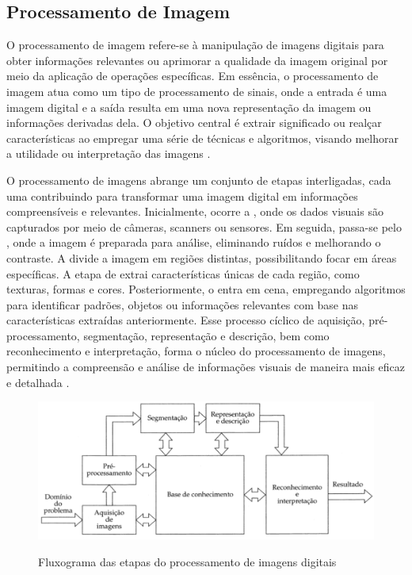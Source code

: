 \subsection[Processamento de Imagem]{Processamento de Imagem}

O processamento de imagem refere-se à manipulação de imagens digitais para obter informações relevantes ou aprimorar a qualidade da imagem original por meio da aplicação de operações específicas. Em essência, o processamento de imagem atua como um tipo de processamento de sinais, onde a entrada é uma imagem digital e a saída resulta em uma nova representação da imagem ou informações derivadas dela. O objetivo central é extrair significado ou realçar características ao empregar uma série de técnicas e algoritmos, visando melhorar a utilidade ou interpretação das imagens \cite{imagemIBM}.

O processamento de imagens abrange um conjunto de etapas interligadas, cada uma contribuindo para transformar uma imagem digital em informações compreensíveis e relevantes. Inicialmente, ocorre a , onde os dados visuais são capturados por meio de câmeras, scanners ou sensores. Em seguida, passa-se pelo , onde a imagem é preparada para análise, eliminando ruídos e melhorando o contraste. A  divide a imagem em regiões distintas, possibilitando focar em áreas específicas. A etapa de  extrai características únicas de cada região, como texturas, formas e cores. Posteriormente, o  entra em cena, empregando algoritmos para identificar padrões, objetos ou informações relevantes com base nas características extraídas anteriormente. Esse processo cíclico de aquisição, pré-processamento, segmentação, representação e descrição, bem como reconhecimento e interpretação, forma o núcleo do processamento de imagens, permitindo a compreensão e análise de informações visuais de maneira mais eficaz e detalhada \cite{imagemMonocromatica}.


\begin{figure}[!htb]
	\centering
    \caption{Fluxograma das etapas do processamento de imagens digitais}
	\includegraphics[scale=0.4]{figuras/processamento_imagem/ProcessamentoImagem.png}
	\label{fig:Fluxograma das etapas do processamento de imagens digitais}
\end{figure}




